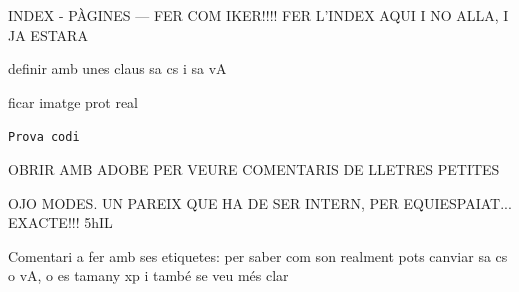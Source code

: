 \clearpage

INDEX - PÀGINES --- FER COM IKER!!!!
FER L'INDEX AQUI I NO ALLA, I JA ESTARA

definir amb unes claus sa cs i sa vA

ficar imatge prot real

\texttt{Prova codi}

OBRIR AMB ADOBE PER VEURE COMENTARIS DE LLETRES PETITES

OJO MODES. UN PAREIX QUE HA DE SER INTERN, PER EQUIESPAIAT... EXACTE!!! 5hIL

Comentari a fer amb ses etiquetes:
per saber com son realment pots canviar sa cs o vA, o es tamany xp i també se veu més clar